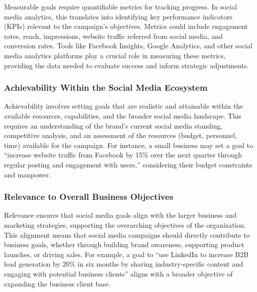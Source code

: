 \documentclass[
]{book}
\begin{document}
Measurable goals require quantifiable metrics for tracking progress. In social media analytics, this translates into identifying key performance indicators (KPIs) relevant to the campaign's objectives. Metrics could include engagement rates, reach, impressions, website traffic referred from social media, and conversion rates. Tools like Facebook Insights, Google Analytics, and other social media analytics platforms play a crucial role in measuring these metrics, providing the data needed to evaluate success and inform strategic adjustments.

\hypertarget{achievability-within-the-social-media-ecosystem}{%
\subsubsection*{Achievability Within the Social Media Ecosystem}\label{achievability-within-the-social-media-ecosystem}}

Achievability involves setting goals that are realistic and attainable within the available resources, capabilities, and the broader social media landscape. This requires an understanding of the brand's current social media standing, competitive analysis, and an assessment of the resources (budget, personnel, time) available for the campaign. For instance, a small business may set a goal to ``increase website traffic from Facebook by 15\% over the next quarter through regular posting and engagement with users,'' considering their budget constraints and manpower.

\hypertarget{relevance-to-overall-business-objectives}{%
\subsubsection*{Relevance to Overall Business Objectives}\label{relevance-to-overall-business-objectives}}

Relevance ensures that social media goals align with the larger business and marketing strategies, supporting the overarching objectives of the organization. This alignment means that social media campaigns should directly contribute to business goals, whether through building brand awareness, supporting product launches, or driving sales. For example, a goal to ``use LinkedIn to increase B2B lead generation by 20\% in six months by sharing industry-specific content and engaging with potential business clients'' aligns with a broader objective of expanding the business client base.
\end{document}
